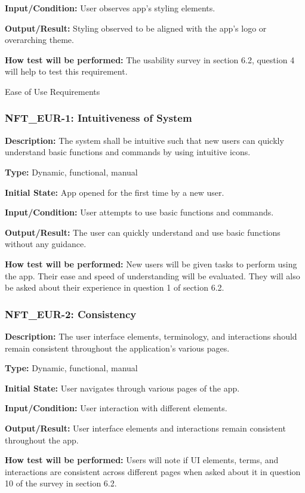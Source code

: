 \documentclass[12pt, titlepage]{article}
\begin{document}
\textbf{Input/Condition: }User observes app's styling elements.

\textbf{Output/Result: }Styling observed to be aligned with the app's logo or overarching theme.

\textbf{How test will be performed:} The usability survey in section 6.2, question 4 will help to test this requirement.


{Ease of Use Requirements}


\subsubsection*{\textbf{NFT\_EUR-1: Intuitiveness of System}
}

\textbf{Description: }The system shall be intuitive such that new users can quickly understand basic functions and commands by using intuitive icons.

\textbf{Type:} Dynamic, functional, manual

\textbf{Initial State:} App opened for the first time by a new user.

\textbf{Input/Condition:} User attempts to use basic functions and commands.

\textbf{Output/Result:} The user can quickly understand and use basic functions without any guidance.

\textbf{How test will be performed:} New users will be given tasks to perform using the app. Their ease and speed of understanding will be evaluated. They will also be asked about their experience in question 1 of section 6.2. 


\subsubsection*{\textbf{NFT\_EUR-2: Consistency}
}

\textbf{Description: }The user interface elements, terminology, and interactions should remain consistent throughout the application’s various pages.

\textbf{Type:} Dynamic, functional, manual

\textbf{Initial State: }User navigates through various pages of the app.

\textbf{Input/Condition:} User interaction with different elements.

\textbf{Output/Result: }User interface elements and interactions remain consistent throughout the app.

\textbf{How test will be performed: }Users will note if UI elements, terms, and interactions are consistent across different pages when asked about it in question 10 of the survey in section 6.2. 
\newline
\end{document}
